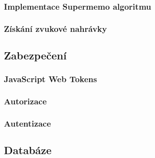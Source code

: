 \documentclass[a4paper,11pt,titlepage,fleqn]{article}
\begin{document}
        \subsubsection{Implementace Supermemo algoritmu}
            


        \subsubsection{Získání zvukové nahrávky}
    
    \subsection{Zabezpečení}

        \subsubsection{JavaScript Web Tokens}
            \label{jwt}

        \subsubsection{Autorizace}

        \subsubsection{Autentizace}

    \subsection{Databáze}
        \label{db}
\end{document}

